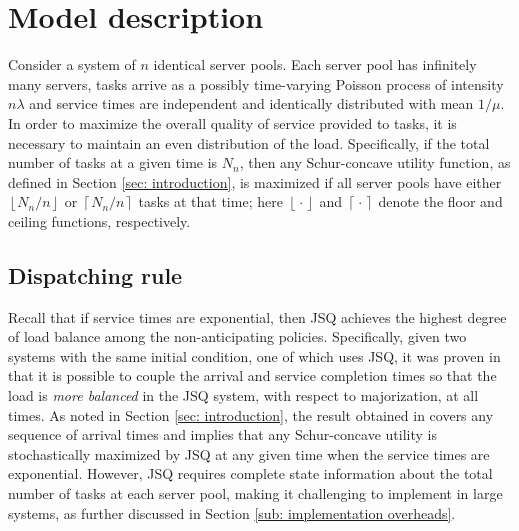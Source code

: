 \documentclass[a4paper, 12pt]{article}
\theoremstyle{definition}
\newcommand{\floor}[1]{\left\lfloor#1\right\rfloor}
\newcommand{\ceil}[1]{\left\lceil#1\right\rceil}
\newcommand{\scdot}{{}\cdot{}}
\begin{document}
\section{Model description}
\label{sec: model description}

Consider a system of $n$ identical server pools. Each server pool has infinitely many servers, tasks arrive as a possibly time-varying Poisson process of intensity $n \lambda$ and service times are independent and identically distributed with mean $1 / \mu$. In order to maximize the overall quality of service provided to tasks, it is necessary to maintain an even distribution of the load. Specifically, if the total number of tasks at a given time is $N_n$, then any Schur-concave utility function, as defined in Section \ref{sec: introduction}, is maximized if all server pools have either $\floor{N_n / n}$ or $\ceil{N_n / n}$ tasks at that time; here $\floor{\scdot}$ and $\ceil{\scdot}$ denote the floor and ceiling functions, respectively.

\subsection{Dispatching rule}
\label{sub: dispatching rule}

Recall that if service times are exponential, then JSQ achieves the highest degree of load balance among the non-anticipating policies. Specifically, given two systems with the same initial condition, one of which uses JSQ, it was proven in \cite{sparaggis1993extremal} that it is possible to couple the arrival and service completion times so that the load is \emph{more balanced} in the JSQ system, with respect to majorization, at all times. As noted in Section \ref{sec: introduction}, the result obtained in \cite{sparaggis1993extremal} covers any sequence of arrival times and implies that any Schur-concave utility is stochastically maximized by JSQ at any given time when the service times are exponential. However, JSQ requires complete state information about the total number of tasks at each server pool, making it challenging to implement in large systems, as further discussed in Section \ref{sub: implementation overheads}.
\end{document}
